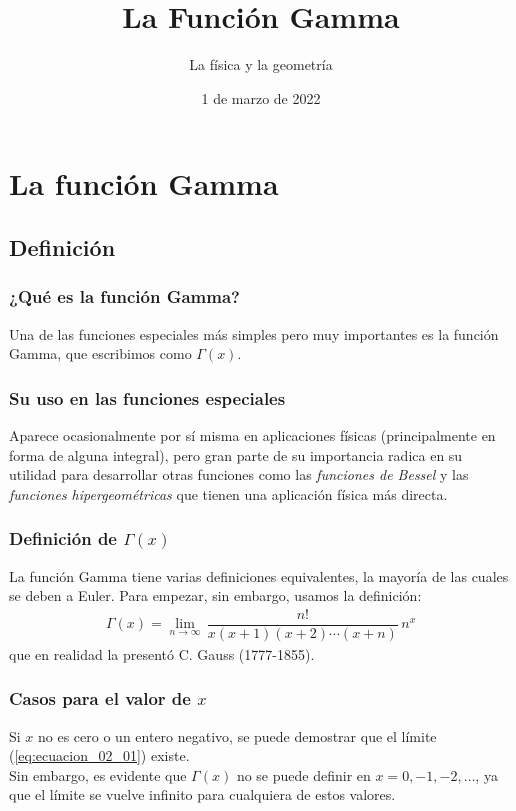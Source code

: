 \documentclass[12pt]{beamer}
\date{1 de marzo de 2022}
\title{La Función Gamma}
\subtitle{La física y la geometría}
\begin{document}
\maketitle
\fontsize{14}{14}\selectfont
{}


\section{La función Gamma}

\subsection{Definición}

\begin{frame}
\frametitle{¿Qué es la función Gamma?}
Una de las funciones especiales más simples pero muy importantes es la función Gamma, que escribimos como $\Gamma (x)$. 
\end{frame}
\begin{frame}
\frametitle{Su uso en las funciones especiales}
Aparece ocasionalmente por sí misma en aplicaciones físicas (principalmente en forma de alguna integral), pero gran parte de su importancia radica en su utilidad para desarrollar otras funciones como las \emph{funciones de Bessel} y las \emph{funciones hipergeométricas} que tienen una aplicación física más directa.
\end{frame}
\begin{frame}
\frametitle{Definición de $\Gamma (x)$}
La función Gamma tiene varias definiciones equivalentes, la mayoría de las cuales se deben a Euler. Para empezar, sin embargo, usamos la definición:
\pause
\begin{align}
\Gamma (x) = \lim_{n \to \infty} \, \dfrac{n!}{x (x + 1)(x + 2) \cdots (x + n)} \, n^{x}
\label{eq:ecuacion_02_01}
\end{align}
que en realidad la presentó C. Gauss (1777-1855).
\end{frame}
\begin{frame}
\frametitle{Casos para el valor de $x$}
Si $x$ no es cero o un entero negativo, se puede demostrar que el límite (\ref{eq:ecuacion_02_01}) existe.
\\
\bigskip
\pause
Sin embargo, es evidente que $\Gamma (x)$ no se puede definir en $x = 0, -1, -2, \ldots$, ya que el límite se vuelve infinito para cualquiera de estos valores.
\end{frame}
\end{document}
